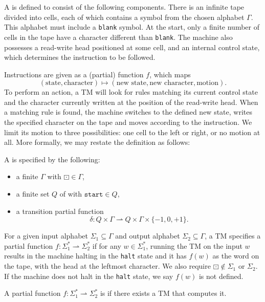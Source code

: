 
A  is defined to consist of the following components.
There is an infinite tape divided into cells, each of which contains a symbol
from the chosen alphabet $\Gamma$.
This alphabet must include a \texttt{blank} symbol.
At the start, only a finite number of cells in the tape have a character
different than \texttt{blank}.
The machine also possesses a read-write head positioned at some cell, and an
internal control state, which determines the instruction to be followed.

Instructions are given as a  (partial) function $f$, which
maps
\[
  (\text{state}, \text{character}) \mapsto (\text{new state}, \text{new
	character}, \text{motion}).
\]
To perform an action, a TM will look for rules matching its current control
state and the character currently written at the position of the read-write
head.
When a matching rule is found, the machine switches to the defined new state,
writes the specified character on the tape and moves according to the
instruction.
We limit its motion to three possibilities: one cell to the left or right, or
no motion at all.
More formally, we may restate the definition as follows:

\begin{definition}
  A  is specified by the following:
  \begin{itemize}
  \item a finite  $\Gamma$ with $\boxdot \in \Gamma$,
  \item a finite set $Q$ of  with $\mathtt{start} \in Q$,
  \item a transition partial function
	\[
	  \delta: Q \times \Gamma \rightharpoonup Q \times \Gamma \times \{-1, 0, +1\}.
	\]
  \end{itemize}
\end{definition}

For a given input alphabet $\Sigma_1 \subseteq \Gamma$ and output alphabet
$\Sigma_2 \subseteq \Gamma$, a TM specifies a partial function $f: \Sigma_1^*
\rightharpoonup \Sigma_2^*$ if for any $w \in \Sigma_1^*$, running the TM on the
input $w$ results in the machine halting in the \texttt{halt} state and it has
$f(w)$ as the word on the tape, with the head at the leftmost character.
We also require $\boxdot \notin \Sigma_1$ or $\Sigma_2$.
If the machine does not halt in the \texttt{halt} state, we say $f(w)$ is not
defined.

\begin{definition}
  A partial function $f: \Sigma_1^* \rightharpoonup \Sigma_2^*$ is
   if there exists a TM that computes it.
\end{definition}

